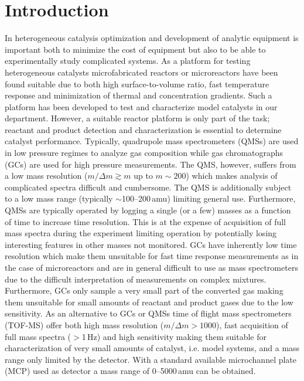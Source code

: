\documentclass[aip,rsi]{revtex4-1}
\begin{document}
\pacs{}%

\maketitle %

\section{Introduction}
In heterogeneous catalysis optimization and development of analytic equipment is important both to minimize the cost of equipment but also to be able to experimentally study complicated systems. As a platform for testing heterogeneous catalysts microfabricated reactors or microreactors have been found suitable due to both high surface-to-volume ratio, fast temperature response and minimization of thermal and concentration gradients\cite{Jensen2001,Jaehnisch2004}. Such a platform has been developed to test and characterize model catalysts in our department\cite{Henriksen2009}. However, a suitable reactor platform is only part of the task; reactant and product detection and characterization is essential to determine catalyst performance. Typically, quadrupole mass spectrometers (QMSs) are used in low pressure regimes to analyze gas composition while gas chromatographs (GCs) are used for high pressure measurements. The QMS, however, suffers from a low mass resolution ($m/\Delta m\gtrsim m$ up to $m\sim200$) which makes analysis of complicated spectra difficult and cumbersome. The QMS is additionally subject to a low mass range (typically $\sim$\mbox{100--200}\,amu) limiting general use. Furthermore, QMSs are typically operated by logging a single (or a few) masses as a function of time to increase time resolution. This is at the expense of acquisition of full mass spectra during the experiment limiting operation by potentially losing interesting features in other masses not monitored. GCs have inherently low time resolution which make them unsuitable for fast time response measurements as in the case of microreactors and are in general difficult to use as mass spectrometers due to the difficult interpretation of measurements on complex mixtures. Furthermore, GCs only sample a very small part of the converted gas making them unsuitable for small amounts of reactant and product gases due to the low sensitivity. As an alternative to GCs or QMSs time of flight mass spectrometers (TOF-MS) offer both high mass resolution ($m/\Delta m>1000$), fast acquisition of full mass spectra ($>$1\,Hz) and high sensitivity making them suitable for characterization of very small amounts of catalyst, i.e. model systems, and a mass range only limited by the detector. With a standard available microchannel plate (MCP) used as detector a mass range of \mbox{0--5000}\,amu can be obtained. 
\end{document}
